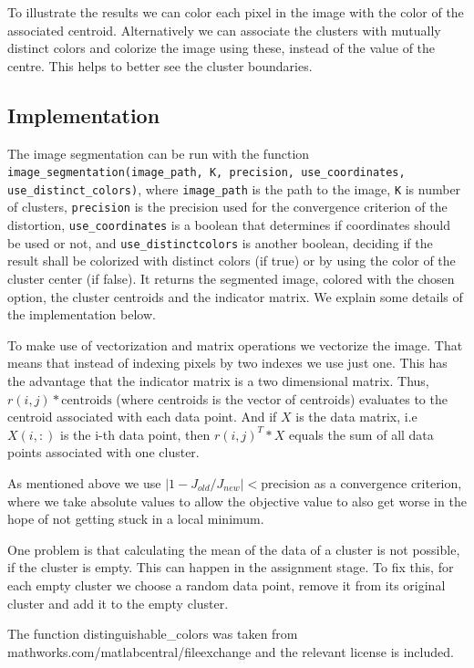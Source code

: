 To illustrate the results we can color each pixel in the image with the color of the associated centroid. Alternatively we can associate the clusters with mutually distinct colors and colorize the image using these, instead of the value of the centre. This helps to better see the cluster boundaries.

\subsection{Implementation}

The image segmentation can be run with the function \texttt{image\_segmentation(image\_path, K, precision, use\_coordinates, use\_distinct\_colors)}, where \texttt{image\_path} is the path to the image, \texttt{K} is number of clusters, \texttt{precision} is the precision used for the convergence criterion of the distortion, \texttt{use\_coordinates} is a boolean that determines if coordinates should be used or not, and \texttt{use\_distinctcolors} is another boolean, deciding if the result shall be colorized with distinct colors (if true) or by using the color of the cluster center (if false). It returns the segmented image, colored with the chosen option, the cluster centroids and the indicator matrix.
 We explain some details of the implementation below.

To make use of vectorization and matrix operations we vectorize the image. That means that instead of indexing pixels by two indexes we use just one. This has the advantage that the indicator matrix is a two dimensional matrix. Thus, $r(i,j)*\text{centroids}$ (where centroids is the vector of centroids) evaluates to the centroid associated with each data point. And if $X$ is the data matrix, i.e $X(i,:)$ is the i-th data point, then $r(i,j)^T * X$ equals the sum of all data points associated with one cluster.

As mentioned above we use $\vert 1-J_{old}/J_{new}\vert < \text{precision}$ as a convergence criterion, where we take absolute values to allow the objective value to also get worse in the hope of not getting stuck in a local minimum.

One problem is that calculating the mean of the data of a cluster is not possible, if the cluster is empty. This can happen in the assignment stage. To fix this, for each empty cluster we choose a random data point, remove it from its original cluster and add it to the empty cluster.

The function distinguishable\_colors was taken from mathworks.com/matlabcentral/fileexchange and the relevant license is included.
